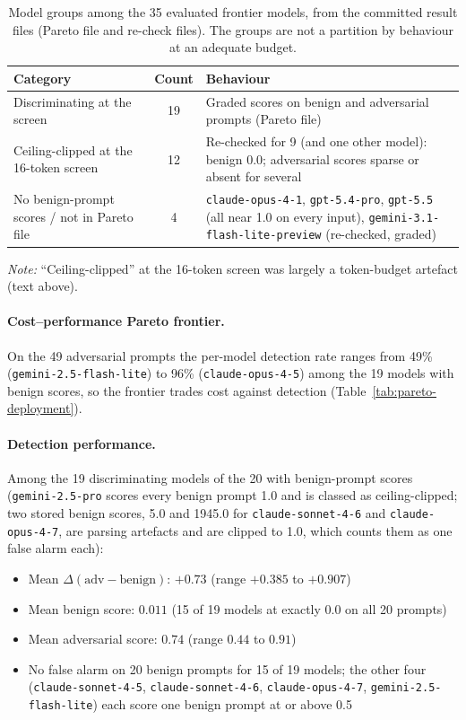 \documentclass{article}
\begin{document}
\begin{table}[h]
\centering
\small
\caption{Model groups among the 35 evaluated frontier models, from the committed result files (Pareto file and re-check files). The groups are not a partition by behaviour at an adequate budget.}
\label{tab:model-taxonomy}
\begin{tabular}{lcp{6.5cm}}
\toprule
\textbf{Category} & \textbf{Count} & \textbf{Behaviour} \\
\midrule
Discriminating at the screen & 19 & Graded scores on benign and adversarial prompts (Pareto file) \\
Ceiling-clipped at the 16-token screen & 12 & Re-checked for 9 (and one other model): benign 0.0; adversarial scores sparse or absent for several \\
No benign-prompt scores / not in Pareto file & 4 & \texttt{claude-opus-4-1}, \texttt{gpt-5.4-pro}, \texttt{gpt-5.5} (all near 1.0 on every input), \texttt{gemini-3.1-flash-lite-preview} (re-checked, graded) \\
\bottomrule
\end{tabular}
\vspace{2pt}

{\footnotesize \textit{Note:} ``Ceiling-clipped'' at the 16-token screen was largely a token-budget artefact (text above).}
\end{table}

\paragraph{Cost--performance Pareto frontier.} On the 49 adversarial prompts the per-model detection rate ranges from 49\% (\texttt{gemini-2.5-flash-lite}) to 96\% (\texttt{claude-opus-4-5}) among the 19 models with benign scores, so the frontier trades cost against detection (Table~\ref{tab:pareto-deployment}).

\paragraph{Detection performance.} Among the 19 discriminating models of the 20 with benign-prompt scores (\texttt{gemini-2.5-pro} scores every benign prompt 1.0 and is classed as ceiling-clipped; two stored benign scores, 5.0 and 1945.0 for \texttt{claude-sonnet-4-6} and \texttt{claude-opus-4-7}, are parsing artefacts and are clipped to 1.0, which counts them as one false alarm each):

\begin{itemize}
\item Mean $\Delta(\text{adv} - \text{benign})$: $+0.73$ (range $+0.385$ to $+0.907$)
\item Mean benign score: $0.011$ (15 of 19 models at exactly $0.0$ on all 20 prompts)
\item Mean adversarial score: $0.74$ (range $0.44$ to $0.91$)
\item No false alarm on 20 benign prompts for 15 of 19 models; the other four (\texttt{claude-sonnet-4-5}, \texttt{claude-sonnet-4-6}, \texttt{claude-opus-4-7}, \texttt{gemini-2.5-flash-lite}) each score one benign prompt at or above 0.5
\end{itemize}
\end{document}
